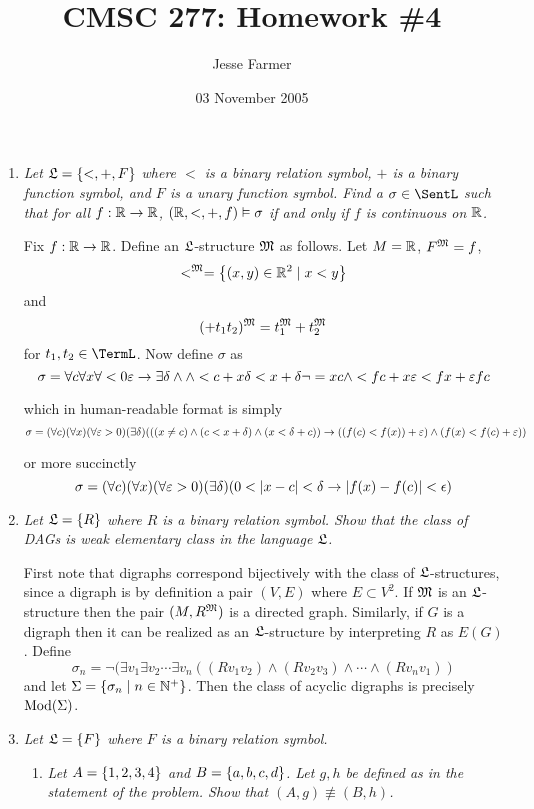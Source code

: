 \documentclass[10pt]{article}
\title{CMSC 277: Homework \#4}
\author{Jesse Farmer}
\date{03 November 2005}
\begin{document}
\maketitle

\begin{enumerate}
\item \emph{Let $\mathfrak{L} = \left\{ <, +, F \right\}$ where $<$ is a binary relation symbol, $+$ is a binary function symbol, and $F$ is a unary function symbol.  Find a $\sigma \in \SentL$ such that for all $f: \mathbb{R} \to \mathbb{R}$, $(\mathbb{R}, <, +, f) \vDash \sigma$ if and only if $f$ is continuous on $\mathbb{R}$.}

Fix $f: \mathbb{R} \to \mathbb{R}$.  Define an $\mathfrak{L}$-structure $\mathfrak{M}$ as follows.  Let $M = \mathbb{R}$, $F^{\mathfrak{M}} = f$, $$<^{\mathfrak{M}} = \left\{ (x,y) \in \mathbb{R}^2 \mid x < y \right\}$$ and $$(+ t_1 t_2)^{\mathfrak{M}} = t_1^{\mathfrak{M}} + t_2^{\mathfrak{M}}$$ for $t_1, t_2 \in \TermL$.  Now define $\sigma$ as
\[
\sigma = \forall c \forall x \forall < 0 \varepsilon \to \exists \delta \land \land < c + x \delta < x + \delta \lnot = x c \land < fc + x \varepsilon < fx + \varepsilon fc
\]

which in human-readable format is simply
\[
\sigma = (\forall c)(\forall x)(\forall \varepsilon > 0)(\exists \delta)(((x \neq c) \land (c < x + \delta) \land (x < \delta+c)) \to ((f(c) < f(x)) + \varepsilon) \land (f(x) < f(c) + \varepsilon))
\]

or more succinctly
\[
\sigma = (\forall c)(\forall x)(\forall \varepsilon > 0)(\exists \delta)(0 < \left| x - c \right| < \delta \to \left| f(x)-f(c) \right| < \epsilon)
\]

\item \emph{Let $\mathfrak{L} = \left\{ R \right\}$ where $R$ is a binary relation symbol.  Show that the class of DAGs is weak elementary class in the language $\mathfrak{L}$.}

First note that digraphs correspond bijectively with the class of $\mathfrak{L}$-structures, since a digraph is by definition a pair $(V,E)$ where $E \subset V^2$.  If $\mathfrak{M}$ is an $\mathfrak{L}$-structure then the pair $(M, R^{\mathfrak{M}})$ is a directed graph.  Similarly, if $G$ is a digraph then it can be realized as an $\mathfrak{L}$-structure by interpreting $R$ as $E(G)$.  Define
\[
\sigma_n = \lnot (\exists v_1 \exists v_2 \cdots \exists v_n ((Rv_1v_2) \land (Rv_2v_3) \land \cdots \land (Rv_nv_1))
\]
and let $\Sigma = \left\{ \sigma_n \mid n \in \mathbb{N}^+ \right\}$.  Then the class of acyclic digraphs is precisely $\operatorname{Mod}(\Sigma)$.

\item \emph{Let $\mathfrak{L} = \left\{ F \right\}$ where $F$ is a binary relation symbol.}
\begin{enumerate}
\item \emph{Let $A = \left\{ 1,2,3,4 \right\}$ and $B = \left\{ a,b,c,d \right\}$.  Let $g,h$ be defined as in the statement of the problem.  Show that $(A,g) \not\equiv (B,h)$.}


\end{enumerate}
\end{enumerate}
\end{document}
